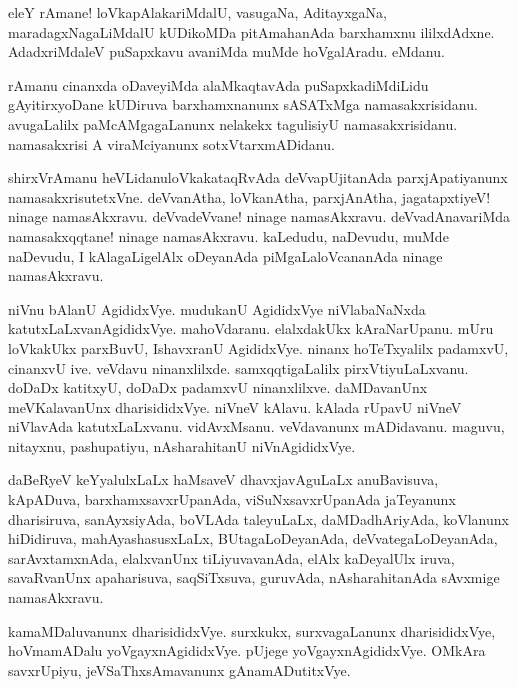 \begin{mng}
eleY rAmane! loVkapAlakariMdalU, vasugaNa, AditayxgaNa, maradagxNagaLiMdalU kUDikoMDa pitAmahanAda barxhamxnu ililxdAdxne. AdadxriMdaleV puSapxkavu avaniMda muMde hoVgalAradu. eMdanu.
\end{mng}

\begin{mng}
rAmanu cinanxda oDaveyiMda alaMkaqtavAda puSapxkadiMdiLidu gAyitirxyoDane kUDiruva barxhamxnanunx sASATxMga namasakxrisidanu. avugaLalilx paMcAMgagaLanunx nelakekx tagulisiyU namasakxrisidanu. namasakxrisi A viraMciyanunx sotxVtarxmADidanu.
\end{mng}

\begin{mng}
shirxVrAmanu heVLidanu\mdash loVkakataqRvAda deVvapUjitanAda parxjApatiyanunx namasakxrisutetxVne. deVvanAtha, loVkanAtha, parxjAnAtha, jagatapxtiyeV! ninage namasAkxravu. deVvadeVvane! ninage namasAkxravu. deVvadAnavariMda namasakxqqtane! ninage namasAkxravu. kaLedudu, naDevudu, muMde naDevudu, I kAlagaLigelAlx oDeyanAda piMgaLaloVcananAda ninage namasAkxravu.
\end{mng}

\begin{mng}
niVnu bAlanU AgididxVye. mudukanU AgididxVye niVlabaNaNxda katutxLaLxvanAgididxVye. mahoVdaranu. elalxdakUkx kAraNarUpanu. mUru loVkakUkx parxBuvU, IshavxranU AgididxVye. ninanx hoTeTxyalilx padamxvU, cinanxvU ive. veVdavu ninanxlilxde. samxqqtigaLalilx pirxVtiyuLaLxvanu. doDaDx katitxyU, doDaDx padamxvU ninanxlilxve. daMDavanUnx meVKalavanUnx dharisididxVye. niVneV kAlavu. kAlada rUpavU niVneV niVlavAda katutxLaLxvanu. vidAvxMsanu. veVdavanunx mADidavanu. maguvu, nitayxnu, pashupatiyu, nAsharahitanU niVnAgididxVye.
\end{mng}

\begin{mng}
daBeRyeV keYyalulxLaLx haMsaveV dhavxjavAguLaLx anuBavisuva, kApADuva, barxhamxsavxrUpanAda, viSuNxsavxrUpanAda jaTeyanunx dharisiruva, sanAyxsiyAda, boVLAda taleyuLaLx, daMDadhAriyAda, koVlanunx hiDidiruva, mahAyashasusxLaLx, BUtagaLoDeyanAda, deVvategaLoDeyanAda, sarAvxtamxnAda, elalxvanUnx tiLiyuvavanAda, elAlx kaDeyalUlx iruva, savaRvanUnx apaharisuva, saqSiTxsuva, guruvAda, nAsharahitanAda sAvxmige namasAkxravu.
\end{mng}

\begin{mng}
kamaMDaluvanunx dharisididxVye. surxkukx, surxvagaLanunx dharisididxVye, hoVmamADalu yoVgayxnAgididxVye. pUjege yoVgayxnAgididxVye. OMkAra savxrUpiyu, jeVSaThxsAmavanunx gAnamADutitxVye.
\end{mng}

